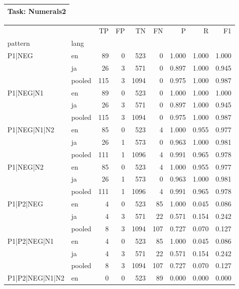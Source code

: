 
\begin{table}[h!]
\centering
\begin{tabular}{p{}}
\toprule
\textbf{Task: Numerals2} \\
\midrule
\end{tabular}
\vspace{10pt}
\begin{tabular}{llrrrrrrr}
\toprule
 &  & TP & FP & TN & FN & P & R & F1 \\
pattern & lang &  &  &  &  &  &  &  \\
\midrule
\multirow[t]{3}{*}{P1|NEG} & en & 89 & 0 & 523 & 0 & 1.000 & 1.000 & 1.000 \\
 & ja & 26 & 3 & 571 & 0 & 0.897 & 1.000 & 0.945 \\
 & pooled & 115 & 3 & 1094 & 0 & 0.975 & 1.000 & 0.987 \\
\cline{1-9}
\multirow[t]{3}{*}{P1|NEG|N1} & en & 89 & 0 & 523 & 0 & 1.000 & 1.000 & 1.000 \\
 & ja & 26 & 3 & 571 & 0 & 0.897 & 1.000 & 0.945 \\
 & pooled & 115 & 3 & 1094 & 0 & 0.975 & 1.000 & 0.987 \\
\cline{1-9}
\multirow[t]{3}{*}{P1|NEG|N1|N2} & en & 85 & 0 & 523 & 4 & 1.000 & 0.955 & 0.977 \\
 & ja & 26 & 1 & 573 & 0 & 0.963 & 1.000 & 0.981 \\
 & pooled & 111 & 1 & 1096 & 4 & 0.991 & 0.965 & 0.978 \\
\cline{1-9}
\multirow[t]{3}{*}{P1|NEG|N2} & en & 85 & 0 & 523 & 4 & 1.000 & 0.955 & 0.977 \\
 & ja & 26 & 1 & 573 & 0 & 0.963 & 1.000 & 0.981 \\
 & pooled & 111 & 1 & 1096 & 4 & 0.991 & 0.965 & 0.978 \\
\cline{1-9}
\multirow[t]{3}{*}{P1|P2|NEG} & en & 4 & 0 & 523 & 85 & 1.000 & 0.045 & 0.086 \\
 & ja & 4 & 3 & 571 & 22 & 0.571 & 0.154 & 0.242 \\
 & pooled & 8 & 3 & 1094 & 107 & 0.727 & 0.070 & 0.127 \\
\cline{1-9}
\multirow[t]{3}{*}{P1|P2|NEG|N1} & en & 4 & 0 & 523 & 85 & 1.000 & 0.045 & 0.086 \\
 & ja & 4 & 3 & 571 & 22 & 0.571 & 0.154 & 0.242 \\
 & pooled & 8 & 3 & 1094 & 107 & 0.727 & 0.070 & 0.127 \\
\cline{1-9}
\multirow[t]{3}{*}{P1|P2|NEG|N1|N2} & en & 0 & 0 & 523 & 89 & 0.000 & 0.000 & 0.000 \\

\end{tabular}
\end{table}
